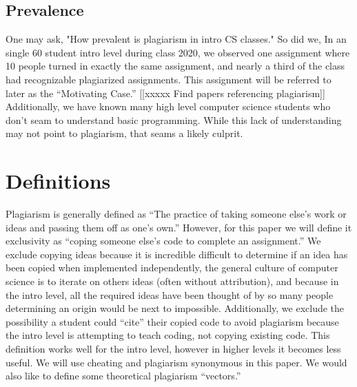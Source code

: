 \documentclass[12pt,final,thesis,actual]{uhthesis}
\newcommand{\n}{\hfill\break}
\begin{document}
		\section{Prevalence}
		 One may ask, "How prevalent is plagiarism in intro CS classes." So did we, In an single 60 student intro level during class 2020, we observed one assignment where 10 people turned in exactly the same assignment, and nearly a third of the class had recognizable plagiarized assignments.   This assignment will be referred to later as the ``Motivating Case.''
		 [[xxxxx Find papers referencing plagiarism]]
		 Additionally, we have known many high level computer science students who don't seam to understand basic programming.  While this lack of understanding may not point to plagiarism, that seams a likely culprit.
		
\n\chapter{\textbf{Definitions}}
Plagiarism is generally defined as ``The practice of taking someone else's work or ideas and passing them off as one's own.''\cite{oxed}  However, for this paper we will define it exclusivity as ``coping someone else's code to complete an assignment.''  We exclude copying ideas because it is incredible difficult to determine if an idea has been copied when implemented independently, the general culture of computer science is to iterate on others ideas (often without attribution), and because in the intro level, all the required ideas have been thought of by so many people determining an origin would be next to impossible.  Additionally, we exclude the possibility a student could ``cite'' their copied code to avoid plagiarism because the intro level is attempting to teach coding, not copying existing code.  This definition works well for the intro level, however in higher levels it becomes less useful.  We will use cheating and plagiarism synonymous in this paper.  We would also like to define some theoretical plagiarism ``vectors.''
\end{document}
